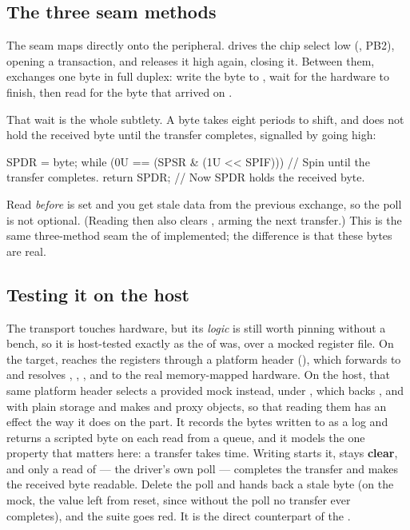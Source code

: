 \subsection{The three seam methods}
\label{c9:sec:seam_methods}
The seam maps directly onto the peripheral.  drives the chip select low (,
PB2), opening a transaction, and  releases it high again, closing it. Between them,
 exchanges one byte in full duplex: write the byte to , wait for the
hardware to finish, then read  for the byte that arrived on .

That wait is the whole subtlety. A byte takes eight  periods to shift, and  does
not hold the received byte until the transfer completes, signalled by  going high:

\begin{cppcode}
SPDR = byte;
while (0U == (SPSR & (1U << SPIF))) {} // Spin until the transfer completes.
return SPDR;                           // Now SPDR holds the received byte.
\end{cppcode}

\noindent Read  \emph{before}  is set and you get stale data from the previous
exchange, so the poll is not optional. (Reading  then  also clears
, arming the next transfer.) This is the same three-method seam the  of
 implemented; the difference is that these bytes are real.

\subsection{Testing it on the host}
\label{c9:sec:host_testing}
The transport touches hardware, but its \emph{logic} is still worth pinning without a bench, so it
is host-tested exactly as the  of  was, over a mocked register file. On the
target,  reaches the registers through a platform header
(), which forwards to  and resolves ,
, ,  and  to the real memory-mapped hardware. On the
host, that same platform header selects a provided mock instead, under , which
backs ,  and  with plain storage and makes  and
 proxy objects, so that reading them has an effect the way it does on the part. It records
the bytes written to  as a  log and returns a scripted byte on each
 read from a  queue, and it models the one property that matters here: a
transfer takes time. Writing  starts it,  stays \textbf{clear}, and only a
read of  --- the driver's own poll --- completes the transfer and makes the received byte
readable. Delete the poll and  hands back a stale byte (on the
mock, the value left from reset, since without the poll no transfer ever completes), and the suite
goes red. It is the direct counterpart of the .

